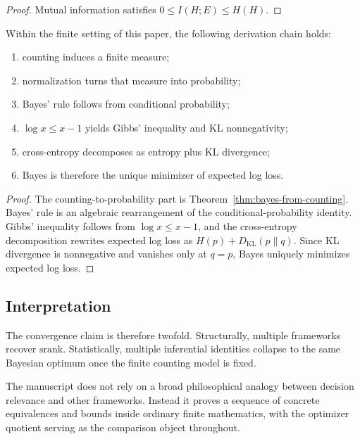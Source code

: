 \begin{proof}
Mutual information satisfies $0 \le I(H;E) \le H(H)$.
\end{proof}

\begin{theorem}\label{thm:bayesian-optimality-chain}
Within the finite setting of this paper, the following derivation chain holds:
\begin{enumerate}
\item counting induces a finite measure;
\item normalization turns that measure into probability;
\item Bayes' rule follows from conditional probability;
\item $\log x \le x-1$ yields Gibbs' inequality and KL nonnegativity;
\item cross-entropy decomposes as entropy plus KL divergence;
\item Bayes is therefore the unique minimizer of expected log loss.
\end{enumerate}
\end{theorem}

\begin{proof}
The counting-to-probability part is Theorem~\ref{thm:bayes-from-counting}. Bayes' rule is an algebraic rearrangement of the conditional-probability identity. Gibbs' inequality follows from $\log x \le x-1$, and the cross-entropy decomposition rewrites expected log loss as $H(p)+D_{\mathrm{KL}}(p\|q)$. Since KL divergence is nonnegative and vanishes only at $q=p$, Bayes uniquely minimizes expected log loss.
\end{proof}

\subsection{Interpretation}

The convergence claim is therefore twofold. Structurally, multiple frameworks recover $\mathrm{srank}$. Statistically, multiple inferential identities collapse to the same Bayesian optimum once the finite counting model is fixed.

The manuscript does not rely on a broad philosophical analogy between decision relevance and other frameworks. Instead it proves a sequence of concrete equivalences and bounds inside ordinary finite mathematics, with the optimizer quotient serving as the comparison object throughout.
